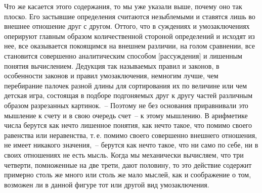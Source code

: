 
Что же касается этого содержания, то мы уже указали
выше, почему оно так плоско. Его застывшие
определения считаются незыблемыми и ставятся лишь
во внешнее отношение друг с другом. Оттого, что в суждениях
и умозаключениях оперируют главным образом
количественной стороной определений и исходят из нее,
все оказывается покоящимся на внешнем различии, на
голом сравнении, все становится совершенно аналитическим
способом [рассуждения] и лишенным понятия
вычислением. Дедукция так называемых правил и законов,
в особенности законов и правил умозаключения,
немногим лучше, чем перебирание палочек разной длины
для сортирования их по величине или чем детская игра,
состоящая в подборе подгоняемых друг к другу частей
различным образом разрезанных картинок.~-- Поэтому не
без основания приравнивали это мышление к счету и в
свою очередь счет~-- к этому мышлению. В арифметике
числа берутся как нечто лишенное понятия, как нечто такое,
что помимо своего равенства или неравенства, т.\,е.
помимо своего совершенно внешнего отношения, не имеет
никакого значения,~-- берутся как нечто такое, что
ни само по себе, ни в своих отношениях не есть мысль.
Когда мы механически вычисляем, что три четверти,
помноженные на две трети, дают половину, то это действие
содержит примерно столь же много или столь же
мало мыслей, как и соображение о том, возможен ли в
данной фигуре тот или другой вид умозаключения.

